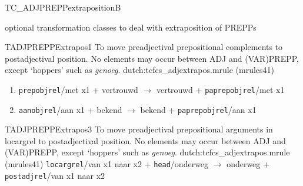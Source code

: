 \begin{mruleclass}{TC\_ADJPREPPextrapositionB}
\begin{classdescr}
\kind optional transformation classes 
\classtask to deal with extraposition of PREPPs
\classremarks

\nofilters


\nospeedrules

\noplannedrules

\norulesnotince

\end{classdescr}
\begin{members}
\begin{member}
 TADJPREPPExtrapos1
 To move preadjectival prepositional complements
to postadjectival 
position. No elements may occur between ADJ and (VAR)PREPP, except `hoppers' 
such as {\em genoeg}.
\file dutch:tcfcs\_adjextrapos.mrule (mrules41)
\semantics \nosemantics
\example \mbox{}
\begin{enumerate}
  \item 
{\tt prepobjrel}/met x1 + vertrouwd $\rightarrow$ vertrouwd + {\tt paprepobjrel}/met x1
  \item 
{\tt aanobjrel}/aan x1 + bekend $\rightarrow$ bekend + {\tt paprepobjrel}/aan x1
\end{enumerate}
\remarks\mbox{}

\end{member}
\begin{member}
 TADJPREPPExtrapos3
To move preadjectival prepositional arguments in locargrel
to postadjectival 
position.
No elements may occur between ADJ and (VAR)PREPP, except `hoppers' 
such as {\em genoeg}.
\file dutch:tcfcs\_adjextrapos.mrule (mrules41)
\semantics \nosemantics
\example \mbox{}
{\tt locargrel}/van x1 naar x2 + {\tt head}/onderweg 
$\rightarrow$ onderweg + {\tt postadjrel}/van x1 naar x2
\remarks\mbox{}

\end{member}
\end{members}
\end{mruleclass}


